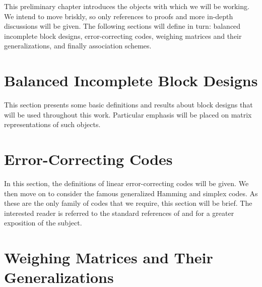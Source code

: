 \documentclass[../../main]{subfiles}
\begin{document}
This preliminary chapter introduces the objects with which we will be working.
We intend to move briskly, so only references to proofs and more in-depth
discussions will be given. The following sections will define in turn: balanced
incomplete block designs, error-correcting codes, weighing matrices and their
generalizations, and finally association schemes.

\fancyhf{}

\fancyhead[RO,LE]{\thepage} 

\section{\centering Balanced Incomplete Block Designs}

This section presents some basic definitions and results about block designs
that will be used throughout this work. Particular emphasis will be placed on
matrix representations of such objects. 

\dinkus



\fancyhf{}

\fancyhead[RO,LE]{\thepage} 

\section{\centering Error-Correcting Codes}

In this section, the definitions of linear error-correcting codes will be given.
We then move on to consider the famous generalized Hamming and simplex codes. As
these are the only family of codes that we require, this section will be brief.
The interested reader is referred to the standard references of \cite{pless-book}
and \cite{error-correcting-codes-v1} for a greater exposition of the subject. 

\dinkus



\fancyhf{}

\fancyhead[RO,LE]{\thepage} 

\section{\centering Weighing Matrices and Their Generalizations}
\end{document}
